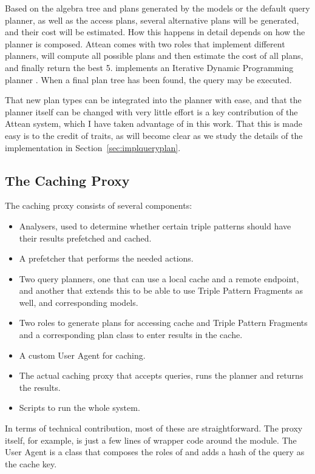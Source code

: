 Based on the algebra tree and plans generated by the models or the
default query planner, as well as the access plans, several
alternative plans will be generated, and their cost will be
estimated. How this happens in detail depends on how the planner is
composed. Attean comes with two roles that implement different
planners,  will compute all
possible plans and then estimate the cost of all plans, and finally
return the best 5.  implements an
Iterative Dynamic Programming planner
\cite{Kossmann:2000:IDP:352958.352982}. When a final plan tree has
been found, the query may be executed.

That new plan types can be integrated into the planner with ease, and
that the planner itself can be changed with very little effort is a
key contribution of the Attean system, which I have taken advantage of
in this work. That this is made easy is to the credit of traits, as
will become clear as we study the details of the implementation in
Section~\ref{sec:implqueryplan}.


\subsection{The Caching Proxy}\label{sec:cacher}

The caching proxy consists of several components:

\begin{itemize}
\item Analysers, used to determine whether certain triple patterns
  should have their results prefetched and cached.
\item A prefetcher that performs the needed actions.
\item Two query planners, one that can use a local cache and a remote
  endpoint, and another that extends this to be able to use Triple
  Pattern Fragments as well, and corresponding models.
\item Two roles to generate plans for accessing cache and Triple
  Pattern Fragments and a corresponding plan class to enter results
  in the cache.
\item A custom User Agent for caching.
\item The actual caching proxy that accepts queries, runs the planner
  and returns the results.
\item Scripts to run the whole system.
\end{itemize}

In terms of technical contribution, most of these are
straightforward. The proxy itself, for example, is just a few lines of
wrapper code around the  module. The User
Agent is a class that composes the roles of
 and adds a hash of the query as
the cache key.

